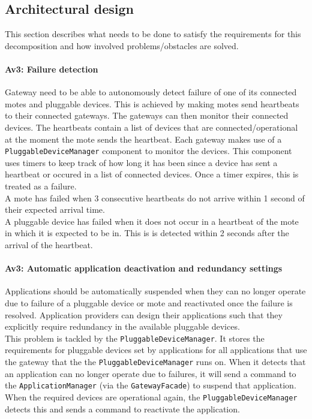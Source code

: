 \subsection{Architectural design}\label{sec:architectural-design}
    This section describes what needs to be done to satisfy the requirements for
    this decomposition and how involved problems/obstacles are solved.

    \paragraph{Av3: Failure detection}
        Gateway need to be able to autonomously detect failure of one of its
        connected motes and pluggable devices. This is achieved by making motes
        send heartbeats to their connected gateways. The gateways can
        then monitor their connected devices. The heartbeats contain a list
        of devices that are connected/operational at the moment the mote sends
        the heartbeat. Each gateway makes use of a \texttt{PluggableDeviceManager}
        component to monitor the devices. This component uses timers to keep track
        of how long it has been since a device has sent a heartbeat or occured in
        a list of connected devices. Once a timer expires, this is treated as
        a failure. \\

        A mote has failed when 3 consecutive heartbeats do not arrive within 1
        second of their expected arrival time. \\
        A pluggable device has failed when it does not occur in a heartbeat of the
        mote in which it is expected to be in. This is is detected within 2
        seconds after the arrival of the heartbeat.

    \paragraph{Av3: Automatic application deactivation and redundancy settings}
        Applications should be automatically suspended when they can no longer
        operate due to failure of a pluggable device or mote and reactivated
        once the failure is resolved. Application providers can design their
        applications such that they explicitly require redundancy in
        the available pluggable devices. \\
        This problem is tackled by the \texttt{PluggableDeviceManager}. It
        stores the requirements for pluggable devices set by applications for all
        applications that use the gateway that the the \texttt{PluggableDeviceManager}
        runs on. When it detects that an application can no longer operate
        due to failures, it will send a command to the \texttt{ApplicationManager}
        (via the \texttt{GatewayFacade})
        to suspend that application. When the required devices are operational
        again, the \texttt{PluggableDeviceManager} detects this and sends a
        command to reactivate the application. \\

